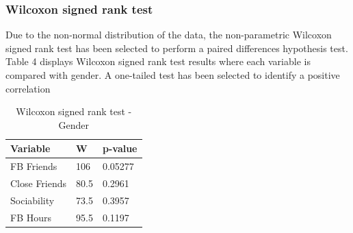 
\subsubsection{Wilcoxon signed rank test}


Due to the non-normal distribution of the data, the non-parametric Wilcoxon signed rank test has been selected to perform a paired differences hypothesis test. Table 4 displays Wilcoxon signed rank test results where each variable is compared with gender. A one-tailed test has been selected to identify a positive correlation 

\begin{table}[H]
\centering
\caption{Wilcoxon signed rank test - Gender}
\begin{tabular}{l|l|l}
Variable      & W    & p-value \\ \hline
FB Friends    & 106  & 0.05277 \\ \hline
Close Friends & 80.5 & 0.2961  \\ \hline
Sociability   & 73.5 & 0.3957  \\ \hline
FB Hours      & 95.5 & 0.1197  \\ \hline
\end{tabular}
\end{table}
